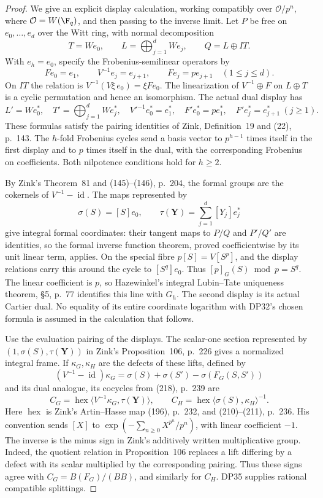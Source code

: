 \documentclass[11pt,a4paper]{article}
\theoremstyle{definition}\newtheorem{remark}[theorem]{Remark}
\newcommand{\id}{\operatorname{id}}\newcommand{\Hom}{\operatorname{Hom}}
\begin{document}
\begin{proof}
We give an explicit display calculation, working compatibly over $\mathcal O/p^n$, where $\mathcal O=W(\F_q)$, and then passing to the inverse limit. Let $P$ be free on $e_0,\ldots,e_d$ over the Witt ring, with normal decomposition
\[
 T=We_0,\qquad L=\bigoplus_{j=1}^dWe_j,\qquad Q=L\oplus IT.
\]
With $e_h=e_0$, specify the Frobenius-semilinear operators by
\[
 Fe_0=e_1,\qquad V^{-1}e_j=e_{j+1},\qquad Fe_j=pe_{j+1}\quad(1\le j\le d).
\]
On $IT$ the relation is $V^{-1}(V\xi\,e_0)=\xi Fe_0$. The linearization of $V^{-1}\oplus F$ on $L\oplus T$ is a cyclic permutation and hence an isomorphism. The actual dual display has
\[
 L'=We_0^*,\quad T'=\bigoplus_{j=1}^dWe_j^*,\quad
 V'^{-1}e_0^*=e_1^*,\quad F'e_0^*=pe_1^*,\quad
 F'e_j^*=e_{j+1}^*\ (j\ge1).
\]
These formulas satisfy the pairing identities of Zink, Definition~19 and (22), p.~143. The $h$-fold Frobenius cycles send a basis vector to $p^{h-1}$ times itself in the first display and to $p$ times itself in the dual, with the corresponding Frobenius on coefficients. Both nilpotence conditions hold for $h\ge2$.

By Zink's Theorem~81 and (145)--(146), p.~204, the formal groups are the cokernels of $V^{-1}-\id$. The maps represented by
\[
 \sigma(S)=[S]e_0,\qquad \tau(\mathbf Y)=\sum_{j=1}^d[Y_j]e_j^*
\]
give integral formal coordinates: their tangent maps to $P/Q$ and $P'/Q'$ are identities, so the formal inverse function theorem, proved coefficientwise by its unit linear term, applies. On the special fibre $p[S]=V[S^p]$, and the display relations carry this around the cycle to $[S^q]e_0$. Thus $[p]_G(S)\bmod p=S^q$. The linear coefficient is $p$, so Hazewinkel's integral Lubin--Tate uniqueness theorem, \S5, p.~77 identifies this line with $G_h$. The second display is its actual Cartier dual. No equality of its entire coordinate logarithm with DP32's chosen formula is assumed in the calculation that follows.

Use the evaluation pairing of the displays. The scalar-one section represented by $(1,\sigma(S),\tau(\mathbf Y))$ in Zink's Proposition~106, p.~226 gives a normalized integral frame. If $\kappa_G,\kappa_H$ are the defects of these lifts, defined by
\[
 (V^{-1}-\id)\kappa_G=\sigma(S)+\sigma(S')-\sigma(F_G(S,S'))
\]
and its dual analogue, its cocycles from (218), p.~239 are
\begin{equation}\label{eq:display-cocycles}
 C_G=\operatorname{hex}\langle V^{-1}\kappa_G,\tau(\mathbf Y)\rangle,
 \qquad C_H=\operatorname{hex}\langle\sigma(S),\kappa_H\rangle^{-1}.
\end{equation}
Here $\operatorname{hex}$ is Zink's Artin--Hasse map (196), p.~232, and (210)--(211), p.~236. His convention sends $[X]$ to $\exp(-\sum_{n\ge0}X^{p^n}/p^n)$, with linear coefficient $-1$. The inverse is the minus sign in Zink's additively written multiplicative group. Indeed, the quotient relation in Proposition~106 replaces a lift differing by a defect with its scalar multiplied by the corresponding pairing. Thus these signs agree with $C_G=B(F_G)/(BB)$, and similarly for $C_H$. DP35 supplies rational compatible splittings.


\end{proof}
\end{document}
